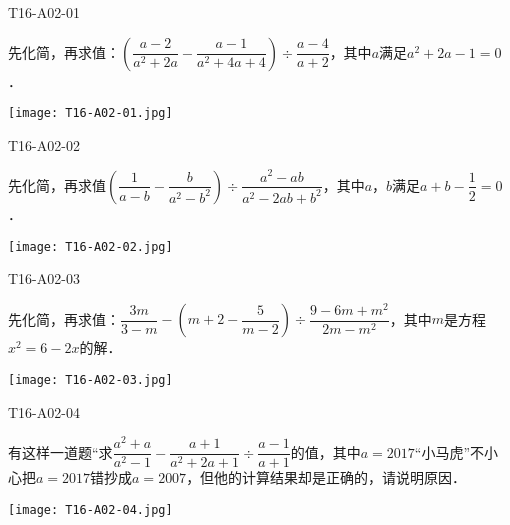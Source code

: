 
\begin{defproblem}{T16-A02-01}%
\begin{onlyproblem}%
先化简，再求值：$\left(\dfrac{a-2}{a^2+2a}-\dfrac{a-1}{a^2+4a+4}\right)\div \dfrac{a-4}{a+2}$，其中$a$满足$a^{2}+2a-1=0$．
\end{onlyproblem}%
\begin{onlysolution}%
\begin{center}
\texttt{[image: T16-A02-01.jpg]}
\end{center}
\end{onlysolution}%
\end{defproblem}


\begin{defproblem}{T16-A02-02}%
\begin{onlyproblem}%
先化简，再求值$\left(\dfrac{1}{a-b}-\dfrac{b}{a^2-b^2}\right)\div \dfrac{a^2-ab}{a^2-2ab+b^2}$，其中$a$，$b$满足$a+b-\dfrac{1}{2}=0$．
\end{onlyproblem}%
\begin{onlysolution}%
\texttt{[image: T16-A02-02.jpg]}
\end{onlysolution}%
\end{defproblem}


\begin{defproblem}{T16-A02-03}%
\begin{onlyproblem}%
先化简，再求值：$\dfrac{3m}{3-m}-\left(m+2-\dfrac{5}{m-2}\right)\div \dfrac{9-6m+m^2}{2m-m^2}$，其中$m$是方程$x^{2}=6-2x$的解．
\end{onlyproblem}%
\begin{onlysolution}%
\begin{center}
\texttt{[image: T16-A02-03.jpg]}
\end{center}
\end{onlysolution}%
\end{defproblem}


\begin{defproblem}{T16-A02-04}%
\begin{onlyproblem}%
有这样一道题``求$\dfrac{a^2+a}{a^2-1}-\dfrac{a+1}{a^2+2a+1}\div \dfrac{a-1}{a+1}$的值，其中$a=2017$``小马虎''不小心把$a=2 017$错抄成$a=2 007$，但他的计算结果却是正确的，请说明原因．
\end{onlyproblem}%
\begin{onlysolution}%
\begin{center}
\texttt{[image: T16-A02-04.jpg]}
\end{center}
\end{onlysolution}%
\end{defproblem}


